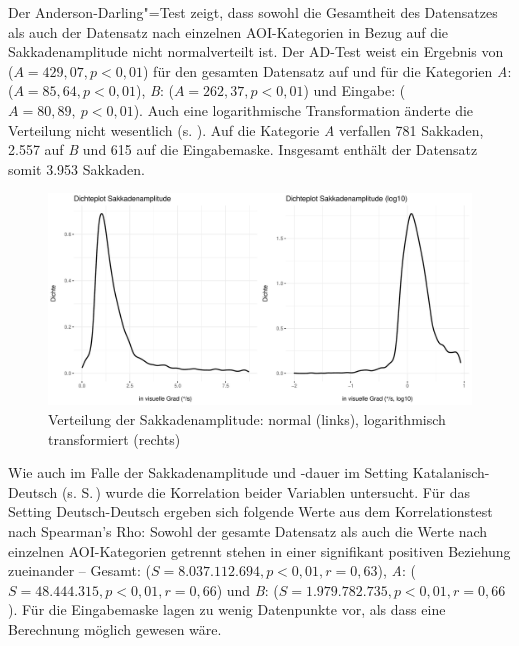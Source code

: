 
Der Anderson-Darling"=Test zeigt, dass sowohl die Gesamtheit des Datensatzes als auch der Datensatz nach einzelnen AOI-Kategorien in Bezug auf die Sakkadenamplitude nicht normalverteilt ist. Der AD-Test weist ein Ergebnis von ($A = 429,07, p < 0,01$) für den gesamten Datensatz auf und für die Kategorien \emph{A}: ($A = 85,64, p < 0,01$), \emph{B}: ($A = 262,37, p < 0,01$) und Eingabe: ($A = 80,89,\allowbreak\ p < 0,01$). Auch eine logarithmische Transformation änderte die Verteilung nicht wesentlich (s. ). Auf die Kategorie \emph{A} verfallen 781 Sakkaden, 2.557 auf \emph{B} und 615 auf die Eingabemaske. Insgesamt enthält der Datensatz somit 3.953 Sakkaden.


\begin{figure}
	\includegraphics[width=\textwidth]{Figures/EyeTracking/DD/ggplot_DD-SacAmp_density_de}
	\caption{Verteilung der Sakkadenamplitude: normal (links), logarithmisch transformiert (rechts)}
	\label{K6:fig:DeDe:sacamp-density}
\end{figure}


Wie auch im Falle der Sakkadenamplitude und -dauer im Setting Katalanisch-Deutsch (s. S.\,\pageref{K6:subsec:sacGaze-CatDe}) wurde die Korrelation beider Variablen untersucht. Für das Setting Deutsch-Deutsch ergeben sich folgende Werte aus dem Korrelationstest nach Spearman's Rho: Sowohl der gesamte Datensatz als auch die Werte nach einzelnen AOI-Kategorien getrennt stehen in einer signifikant positiven Beziehung zueinander -- Gesamt: ($S = 8.037.112.694, p < 0,01, r = 0,63$), \emph{A}: ($S = 48.444.315, p < 0,01, r = 0,66$) und \emph{B}: ($S = 1.979.782.735, p < 0,01, r = 0,66$). Für die Eingabemaske lagen zu wenig Datenpunkte vor, als dass eine Berechnung möglich gewesen wäre.

